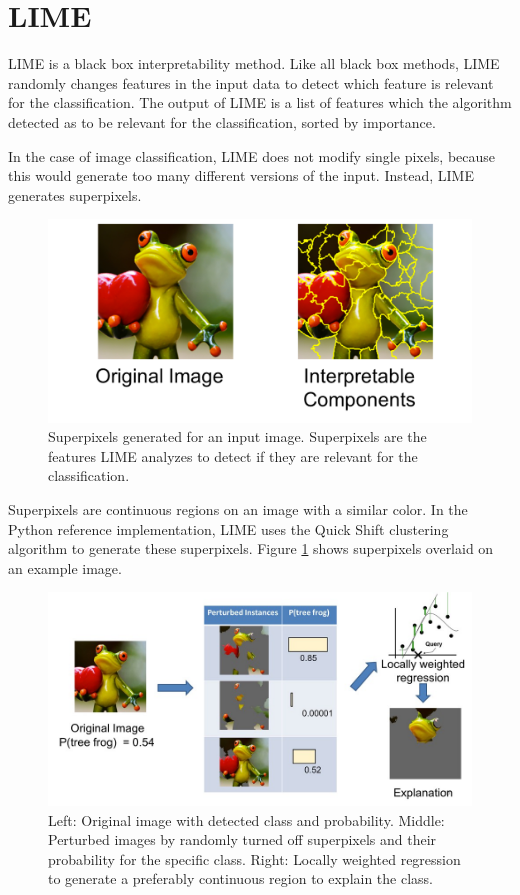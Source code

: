 \section{LIME}

LIME \cite{ribeiro2016should} is a black box interpretability method. Like all black box methods, LIME randomly changes features in the input data to detect which feature is relevant for the classification. The output of LIME is a list of features which the algorithm detected as to be relevant for the classification, sorted by importance.

In the case of image classification, LIME does not modify single pixels, because this would generate too many different versions of the input.
Instead, LIME generates superpixels.

\begin{figure}[H]
\centering
\includegraphics[width=12cm]{chapters/02_methods/images/lime.jpg}
\caption{Superpixels generated for an input image. Superpixels are the features LIME analyzes to detect if they are relevant for the classification.\cite{limeoreilly}}
\label{lime_superpixel}
\end{figure}

Superpixels are continuous regions on an image with a similar color. In the Python reference implementation, LIME uses the Quick Shift \cite{vedaldi2008quick} clustering algorithm to generate these superpixels. Figure \ref{lime_superpixel} shows superpixels overlaid on an example image.

\begin{figure}[H]
\centering
\includegraphics[width=14cm]{chapters/02_methods/images/lime2.jpg}
\caption{Left: Original image with detected class and probability. Middle: Perturbed images by randomly turned off superpixels and their probability for the specific class.
Right: Locally weighted regression to generate a preferably continuous region to explain the class.\cite{limeoreilly}}
\label{lime_perturbed}
\end{figure}

